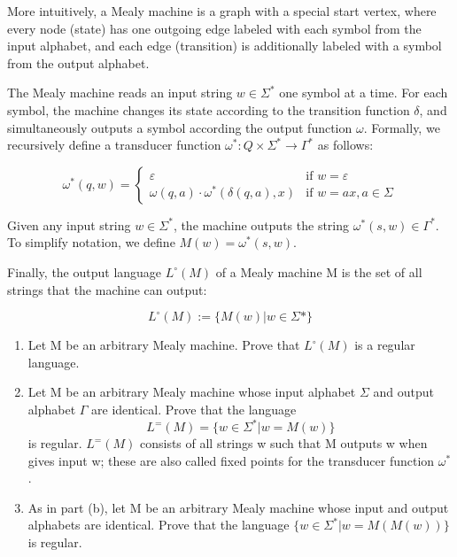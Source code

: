 \documentclass[12pt]{article}
\begin{document}
More intuitively, a Mealy machine is a graph with a special start vertex, where every node (state) has one outgoing edge labeled with each symbol from the input alphabet, and each edge (transition) is additionally labeled with a symbol from the output alphabet.

The Mealy machine reads an input string $w \in \Sigma^*$ one symbol at a time. For each symbol, the machine changes its state according to the transition function $\delta$, and simultaneously outputs a symbol according the output function $\omega$. Formally, we recursively define a transducer function $\omega^* : Q \times \Sigma^* \rightarrow \Gamma^*$ as follows:

\[
\omega^*(q,w)=
\begin{cases}
    \varepsilon & \text{if } w=\varepsilon \\
    \omega(q, a) \cdot \omega^*(\delta(q,a),x) & \text{if } w=ax, a \in \Sigma
\end{cases}
\]

Given any input string $w \in \Sigma^*$, the machine outputs the string $\omega^*(s, w) \in \Gamma^*$. To simplify notation, we define $M(w) = \omega^*(s,w)$.

Finally, the output language $L^\circ(M)$ of a Mealy machine M is the set of all strings that the machine can output:

\begin{equation*}
    L^\circ(M):=\{M(w) | w \in \Sigma \text{*} \}
\end{equation*}

\begin{enumerate}
    \item Let M be an arbitrary Mealy machine. Prove that $L^\circ(M)$ is a regular language.
    \item Let M be an arbitrary Mealy machine whose input alphabet $\Sigma$ and output alphabet $\Gamma$ are identical. Prove that the language
        \begin{equation*}
            L^= (M)=\{ w \in \Sigma^* | w = M(w)\}
        \end{equation*}
    is regular. $L^=(M)$ consists of all strings w such that M outputs w when gives input w; these are also called fixed points for the transducer function $\omega^*$.
    \item As in part (b), let M be an arbitrary Mealy machine whose input and output alphabets are identical. Prove that the language $\{ w \in \Sigma^* | w = M(M(w)) \}$ is regular.
\end{enumerate}
\end{document}
